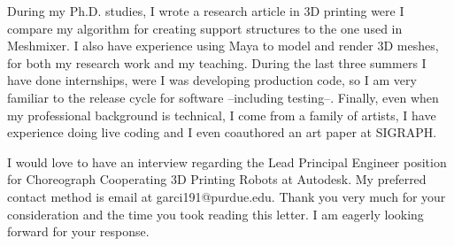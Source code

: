 \documentclass[10pt,stdletter,dateno,sigleft,letterpaper]{newlfm} %
\begin{document}
\begin{newlfm}

During my Ph.D. studies, I wrote a research article in 3D printing were I compare my algorithm for creating support structures to the one used in Meshmixer. I also have experience using Maya to model and render 3D meshes, for both my research work and my teaching. During the last three summers I have done internships, were I was developing production code, so I am very familiar to the release cycle for software --including testing--. Finally, even when my professional background is technical, I come from a family of artists, I have experience doing live coding and I even coauthored an art paper at SIGRAPH.

I would love to have an interview regarding the Lead Principal Engineer position for Choreograph Cooperating 3D Printing Robots at Autodesk. My preferred contact method is email at garci191@purdue.edu. Thank you very much for your consideration and the time you took reading this letter. I am eagerly looking forward for your response.



\end{newlfm}
\end{document}
